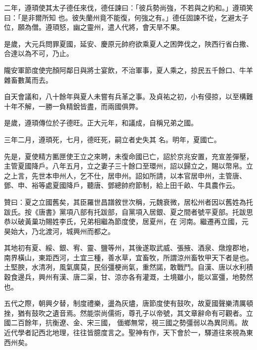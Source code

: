 \begin{pinyinscope}
 二年，遵頊使其太子德任來伐，德任諫曰：「彼兵勢尚強，不若與之約和。」遵頊笑曰：「是非爾所知
 也。彼失蘭州竟不能復，何強之有。」德任固諫不從，乞避太子位，願為僧。遵頊怒，幽之靈州，遣人代將，會天旱不果。



 是歲，大元兵問罪夏國，延安、慶原元帥府欲乘夏人之困弊伐之，陜西行省白撒、合達以為不可，乃止。



 隴安軍節度使完顏阿鄰日與將士宴飲，不治軍事，夏人乘之，掠民五千餘口、牛羊雜畜數萬而去。



 自天會議和，八十餘年與夏人未嘗有兵革之事。及貞祐之初，小有侵掠，以至構難十年不解，一勝一負精銳皆盡，而兩國俱弊。



 是歲，遵頊傳位於子德旺。正大元年，和議成，自稱兄弟之國。



 三年二月，遵頊死，七月，德旺死，嗣立者史失其
 名。明年，夏國亡。



 先是，夏使精方匭匣使王立之來聘，未復命國已亡，詔於京兆安置，充宣差彈壓，主管夏國降戶。八年五月，立之妻子三十餘口至環州，詔以歸立之，賜以幣帛。立之上言，先世本申州人，乞不仕，居申州。詔如所請，以本官居申州，主管唐、鄧、申、裕等處夏國降戶，聽唐、鄧總帥府節制，給上田千畝、牛具農作云。



 贊曰：夏之立國舊矣，其臣羅世昌譜敘世次稱，元魏衰微，居松州者因以舊姓為托跋氏。按《唐書》黨項八部有托跋部，自黨項入居銀、夏之間者號平夏部。托跋思恭以破黃巢功賜姓李氏，兄弟相繼為節度使，居夏州，在
 河南。繼遷再立國，元昊始大，乃北渡河，城興州而都之。



 其地初有夏、綏、銀、宥、靈、鹽等州，其後遂取武威、張掖、酒泉、燉煌郡地，南界橫山，東距西河，土宜三種，善水草，宜畜牧，所謂涼州畜牧甲天下者是也。土堅腴，水清冽，風氣廣莫，民俗彊梗尚氣，重然諾，敢戰鬥。自漢、唐以水利積穀食邊兵，興州有漢、唐二渠，甘、涼亦各有灌溉，土境雖小，能以富彊，地勢然也。



 五代之際，朝興夕替，制度禮樂，盪為灰燼，唐節度使有鼓吹，故夏國聲樂清厲頓挫，猶有鼓吹之遺音焉。然能崇尚儒術，尊孔子以帝號，其文章辭命有可觀者。立國二百餘年，抗衡遼、金、宋三國，
 偭鄉無常，視三國之勢彊弱以為異同焉。故近代學者記西北地理，往往皆臆度言之。聖神有作，天下會於一，驛道往來視為東西州矣。



\end{pinyinscope}